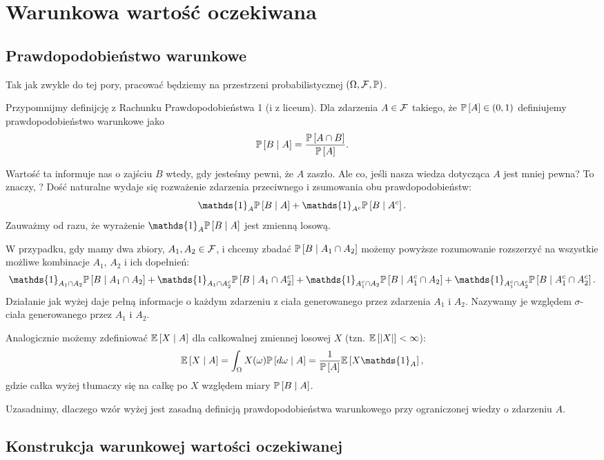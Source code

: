 \section{Warunkowa wartość oczekiwana}

\subsection{Prawdopodobieństwo warunkowe}

Tak jak zwykle do tej pory, pracować będziemy na przestrzeni probabilistycznej $(\Omega,\set{F},\prob)$.

Przypomnijmy definijcję  z Rachunku Prawdopodobieństwa 1 (i z liceum). Dla zdarzenia $A\in\mathcal{F}$ takiego, że $\prob{A}\in(0, 1)$ definiujemy prawdopodobieństwo warunkowe jako
$$\prob{B\;|\;A}=\frac{\prob{A\cap B}}{\prob{A}}.$$

Wartość ta informuje nas o zajściu $B$ wtedy, gdy jesteśmy pewni, że $A$ zaszło. Ale co, jeśli nasza wiedza dotycząca $A$ jest mniej pewna? To znaczy, ? Dość naturalne wydaje się rozważenie zdarzenia przeciwnego i zsumowania obu prawdopodobieństw:
$$\mathds{1}_A\prob{B\;|\;A}+\mathds{1}_{A^c}\prob{B\;|\;A^c}.$$
Zauważmy od razu, że wyrażenie $\mathds{1}_A\prob{B\;|\;A}$ jest zmienną losową.

W przypadku, gdy mamy dwa zbiory, $A_1,A_2\in\mathcal{F}$, i chcemy zbadać $\prob{B\;|\;A_1\cap A_2}$ możemy powyższe rozumowanie rozszerzyć na wszystkie możliwe kombinacje $A_1$, $A_2$ i ich dopełnień:
$$\mathds{1}_{A_1\cap A_2}\prob{B\;|\;A_1\cap A_2}+\mathds{1}_{A_1\cap A_2^c}\prob{B\;|\;A_1\cap A_2^c}+\mathds{1}_{A_1^c\cap A_2}\prob{B\;|\;A_1^c\cap A_2}+\mathds{1}_{A_1^c\cap A_2^c}\prob{B\;|\;A_1^c\cap A_2^c}.$$
Działanie jak wyżej daje pełną informacje o każdym zdarzeniu z ciała generowanego przez zdarzenia $A_1$ i $A_2$. Nazywamy je  względem $\sigma$-ciała generowanego przez $A_1$ i $A_2$.

Analogicznie możemy zdefiniować $\expected{X\;|\;A}$ dla całkowalnej zmiennej losowej $X$ (tzn. $\expected{|X|}<\infty$):
$$\expected{X\;|\;A}=\int_\Omega X(\omega)\prob{d\omega\;|\;A}=\frac{1}{\prob{A}}\expected{X\mathds{1}_A},$$
gdzie całka wyżej tłumaczy się na całkę po $X$ względem miary $\prob{B\;|\;A}$. 

Uzasadnimy, dlaczego wzór wyżej jest zasadną definicją prawdopodobieństwa warunkowego przy ograniczonej wiedzy o zdarzeniu $A$.

\subsection{Konstrukcja warunkowej wartości oczekiwanej}

